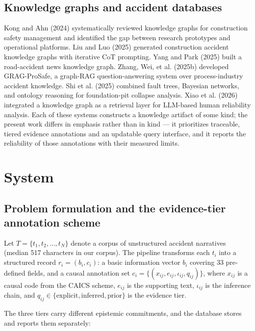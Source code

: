 \documentclass[11pt]{article}
\begin{document}
\subsection{Knowledge graphs and accident databases}
Kong and Ahn (2024) systematically reviewed knowledge graphs for construction safety management and identified the gap between research prototypes and operational platforms. Liu and Luo (2025) generated construction accident knowledge graphs with iterative CoT prompting. Yang and Park (2025) built a road-accident news knowledge graph. Zhang, Wei, et al. (2025b) developed GRAG-ProSafe, a graph-RAG question-answering system over process-industry accident knowledge. Shi et al. (2025) combined fault trees, Bayesian networks, and ontology reasoning for foundation-pit collapse analysis. Xiao et al. (2026) integrated a knowledge graph as a retrieval layer for LLM-based human reliability analysis. Each of these systems constructs a knowledge artifact of some kind; the present work differs in emphasis rather than in kind --- it prioritizes traceable, tiered evidence annotations and an updatable query interface, and it reports the reliability of those annotations with their measured limits.

\section{System}
\subsection{Problem formulation and the evidence-tier annotation scheme}
Let $T = \{t_1, t_2, \dots, t_N\}$ denote a corpus of unstructured accident narratives (median 517 characters in our corpus). The pipeline transforms each $t_i$ into a structured record $r_i = (b_i, c_i)$: a basic information vector $b_i$ covering 33 pre-defined fields, and a causal annotation set $c_i = \{(x_{ij}, e_{ij}, \iota_{ij}, q_{ij})\}$, where $x_{ij}$ is a causal code from the CAICS scheme, $e_{ij}$ is the supporting text, $\iota_{ij}$ is the inference chain, and $q_{ij} \in \{\text{explicit}, \text{inferred}, \text{prior}\}$ is the evidence tier.

The three tiers carry different epistemic commitments, and the database stores and reports them separately:
\end{document}
